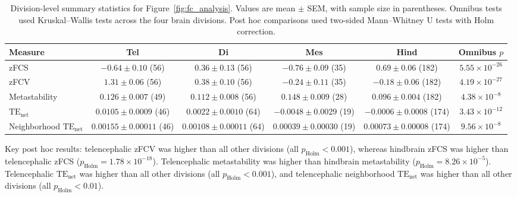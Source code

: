 \begin{table}[t]
\centering
\caption{
Division-level summary statistics for Figure~\ref{fig:fc_analysis}.
Values are mean $\pm$ SEM, with sample size in parentheses.
Omnibus tests used Kruskal--Wallis tests across the four brain divisions.
Post hoc comparisons used two-sided Mann--Whitney U tests with Holm correction.
}
\label{tab:figure9_division_stats}
\begin{tabular}{lccccc}
\hline
Measure & Tel & Di & Mes & Hind & Omnibus $p$ \\
\hline
zFCS &
$-0.64 \pm 0.10$ (56) &
$0.36 \pm 0.13$ (56) &
$-0.76 \pm 0.09$ (35) &
$0.69 \pm 0.06$ (182) &
$5.55 \times 10^{-26}$ \\
zFCV &
$1.31 \pm 0.06$ (56) &
$0.38 \pm 0.10$ (56) &
$-0.24 \pm 0.11$ (35) &
$-0.18 \pm 0.06$ (182) &
$4.19 \times 10^{-27}$ \\
Metastability &
$0.126 \pm 0.007$ (49) &
$0.112 \pm 0.008$ (56) &
$0.148 \pm 0.009$ (28) &
$0.096 \pm 0.004$ (182) &
$4.38 \times 10^{-8}$ \\
$\mathrm{TE}_{\mathrm{net}}$ &
$0.0105 \pm 0.0009$ (46) &
$0.0022 \pm 0.0010$ (64) &
$-0.0048 \pm 0.0029$ (19) &
$-0.0006 \pm 0.0008$ (174) &
$3.43 \times 10^{-12}$ \\
Neighborhood $\mathrm{TE}_{\mathrm{net}}$ &
$0.00155 \pm 0.00011$ (46) &
$0.00108 \pm 0.00011$ (64) &
$0.00039 \pm 0.00030$ (19) &
$0.00073 \pm 0.00008$ (174) &
$9.56 \times 10^{-8}$ \\
\hline
\end{tabular}

\vspace{0.5em}
\begin{minipage}{0.95\linewidth}
\footnotesize
Key post hoc results: telencephalic zFCV was higher than all other divisions
(all $p_{\mathrm{Holm}} < 0.001$), whereas hindbrain zFCS was higher than
telencephalic zFCS ($p_{\mathrm{Holm}} = 1.78 \times 10^{-18}$).
Telencephalic metastability was higher than hindbrain metastability
($p_{\mathrm{Holm}} = 8.26 \times 10^{-5}$).
Telencephalic $\mathrm{TE}_{\mathrm{net}}$ was higher than all other divisions
(all $p_{\mathrm{Holm}} < 0.001$), and telencephalic neighborhood
$\mathrm{TE}_{\mathrm{net}}$ was higher than all other divisions
(all $p_{\mathrm{Holm}} < 0.01$).
\end{minipage}
\end{table}
